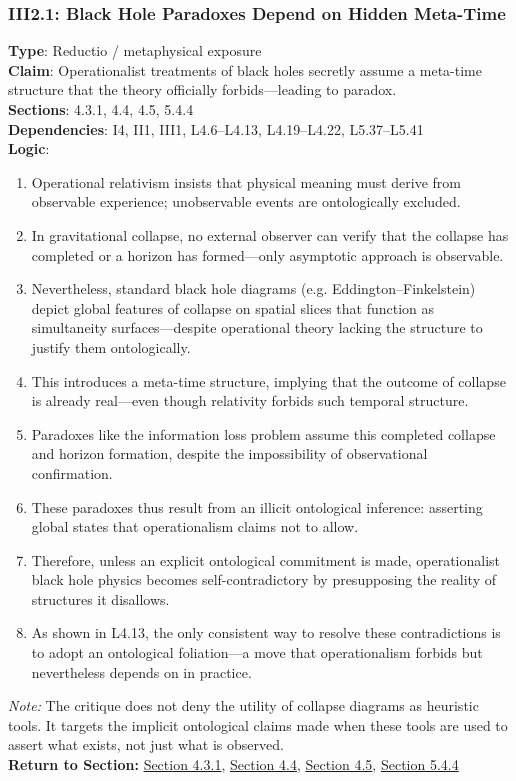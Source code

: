 \documentclass[12pt]{book}
\begin{document}
\subsubsection*{III2.1: Black Hole Paradoxes Depend on Hidden Meta-Time}
\label{appendix:III2.1}
\textbf{Type}: Reductio / metaphysical exposure\\
\textbf{Claim}: Operationalist treatments of black holes secretly assume a meta-time structure that the theory officially forbids---leading to paradox.\\
\textbf{Sections}: 4.3.1, 4.4, 4.5, 5.4.4\\
\textbf{Dependencies}: I4, II1, III1, L4.6–L4.13, L4.19–L4.22, L5.37–L5.41\\
\textbf{Logic}:
\begin{enumerate}
    \item Operational relativism insists that physical meaning must derive from observable experience; unobservable events are ontologically excluded.
    \item In gravitational collapse, no external observer can verify that the collapse has completed or a horizon has formed---only asymptotic approach is observable.
    \item Nevertheless, standard black hole diagrams (e.g. Eddington–Finkelstein) depict global features of collapse on spatial slices that function as simultaneity surfaces---despite operational theory lacking the structure to justify them ontologically.
    \item This introduces a meta-time structure, implying that the outcome of collapse is already real---even though relativity forbids such temporal structure.
    \item Paradoxes like the information loss problem assume this completed collapse and horizon formation, despite the impossibility of observational confirmation.
    \item These paradoxes thus result from an illicit ontological inference: asserting global states that operationalism claims not to allow.
    \item Therefore, unless an explicit ontological commitment is made, operationalist black hole physics becomes self-contradictory by presupposing the reality of structures it disallows.
    \item As shown in L4.13, the only consistent way to resolve these contradictions is to adopt an ontological foliation---a move that operationalism forbids but nevertheless depends on in practice.
\end{enumerate}
\textit{Note:} The critique does not deny the utility of collapse diagrams as heuristic tools. It targets the implicit ontological claims made when these tools are used to assert what exists, not just what is observed.\\
\textbf{Return to Section:} \hyperref[sec:4.3.1]{Section 4.3.1}, \hyperref[sec:4.4]{Section 4.4}, \hyperref[sec:4.5]{Section 4.5}, \hyperref[sec:5.4.4]{Section 5.4.4}
\end{document}
